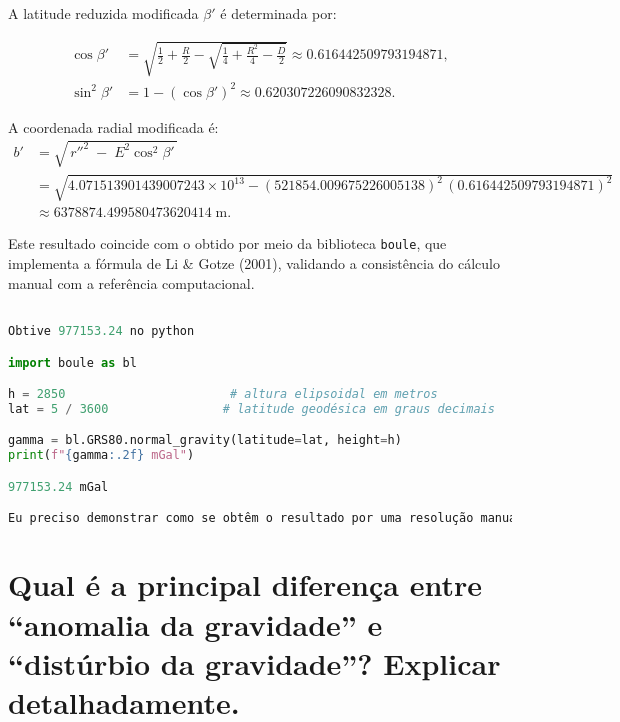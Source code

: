 \noindent
A latitude reduzida modificada \(\beta'\) é determinada por:

\[
\begin{aligned}
   \cos\beta' &= \sqrt{\tfrac12 + \tfrac{R}{2} - \sqrt{\tfrac14 + \tfrac{R^2}{4} - \tfrac{D}{2}}}
   \approx 0.616442509793194871,\\
   \sin^2\beta' &= 1 - (\cos\beta')^2
   \approx 0.620307226090832328.
\end{aligned}
\]

\noindent
A coordenada radial modificada é:
\[
\begin{aligned}
   b' &= \sqrt{\,r''^2 \;-\;E^2\cos^2\beta'\,} \\
   &= \sqrt{4.071513901439007243\times10^{13} - (521854.009675226005138)^2\,(0.616442509793194871)^2} \\
   &\approx 6378874.499580473620414\;\mathrm{m} \text{.}
\end{aligned}
\]



\noindent
Este resultado coincide com o obtido por meio da biblioteca \texttt{boule}, que implementa a fórmula de Li \& Gotze (2001), validando a consistência do cálculo manual com a referência computacional.

\begin{lstlisting}[language=Python, caption={Cálculo da gravidade normal com a biblioteca \texttt{boule} 
para o modelo GRS80}]

Obtive 977153.24 no python

import boule as bl

h = 2850                       # altura elipsoidal em metros
lat = 5 / 3600                # latitude geodésica em graus decimais

gamma = bl.GRS80.normal_gravity(latitude=lat, height=h)
print(f"{gamma:.2f} mGal")

977153.24 mGal

Eu preciso demonstrar como se obtêm o resultado por uma resolução manual 
\end{lstlisting}


\section{Qual é a principal diferença entre “anomalia da gravidade” e “distúrbio da gravidade”? Explicar detalhadamente.}

